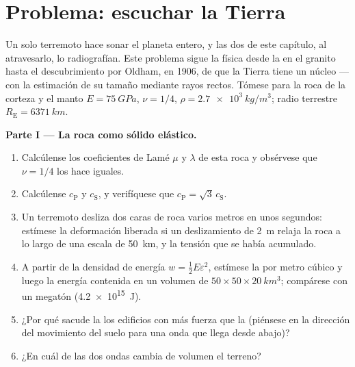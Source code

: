 \section{Problema: escuchar la Tierra}

\begin{problem}\label{pb:b3:continuum-elasticity:1}
Un solo terremoto hace sonar el planeta entero, y las dos 
de este capítulo, al atravesarlo, lo radiografían. Este problema sigue la
física desde la  en el granito hasta el descubrimiento por
Oldham, en 1906, de que la Tierra tiene un núcleo --- con la estimación de
su tamaño mediante rayos rectos. Tómese para la roca de la corteza y el manto
$E = \qty{75}{GPa}$, $\nu = 1/4$, $\rho = \qty{2.7e3}{kg/m^3}$; radio
terrestre $R_{\text{E}} =
\qty{6371}{km}$.

\medskip\noindent\textbf{Parte I --- La roca como sólido elástico.}
\begin{enumerate}
  \item Calcúlense los coeficientes de Lamé $\mu$ y $\lambda$ de esta
        roca y obsérvese que $\nu = 1/4$ los hace iguales.
  \item Calcúlense $c_{\text{P}}$ y $c_{\text{S}}$, y verifíquese que
        $c_{\text{P}} = \sqrt3\,c_{\text{S}}$.
  \item Un terremoto desliza dos caras de roca varios metros en unos
        segundos: estímese la deformación liberada si un deslizamiento de
        \qty{2}{m} relaja la roca a lo largo de una escala de
        \qty{50}{km}, y la tensión que se había acumulado.
  \item A partir de la densidad de energía $w = \tfrac12 E\varepsilon^2$,
        estímese la  por metro cúbico y luego la energía
        contenida en un volumen de $50 \times 50 \times \qty{20}{km^3}$;
        compárese con un megatón (\qty{4.2e15}{J}).
  \item ¿Por qué sacude la  los edificios con más fuerza que la
         (piénsese en la dirección del movimiento del suelo para una
        onda que llega desde abajo)?
  \item ¿En cuál de las dos ondas cambia de volumen el terreno?
\end{enumerate}


\end{problem}
